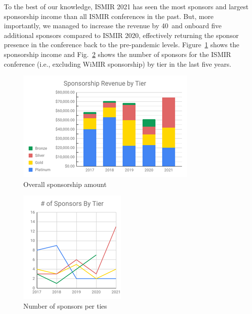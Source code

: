 \documentclass[%
10pt,								%
]
{scrartcl}
\begin{document}
        To the best of our knowledge, ISMIR 2021 has seen the most sponsors and largest sponsorship income than all ISMIR conferences in the past. But, more importantly, we managed to increase the revenue by 40\ and onboard five additional sponsors compared to ISMIR 2020, effectively returning the sponsor presence in the conference back to the pre-pandemic levels. Figure~\ref{fig:sponsorship_amount} shows the sponsorship income and Fig.~\ref{fig:sponsorship_tiers} shows the number of sponsors for the ISMIR conference (i.e., excluding WiMIR sponsorship) by tier in the last five years.  
        \begin{figure}%
            \includegraphics[width=\columnwidth]{fig/sponsorship_amount}%
            \caption{Overall sponsorship amount}%
            \label{fig:sponsorship_amount}%
        \end{figure}
        \begin{figure}%
            \includegraphics[width=\columnwidth]{fig/sponsorship_tiers}%
            \caption{Number of sponsors per ties}%
            \label{fig:sponsorship_tiers}%
        \end{figure}
        
\end{document}

